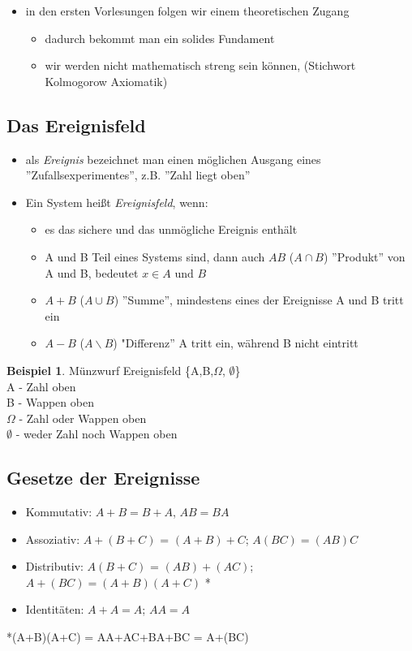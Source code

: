 \documentclass[10pt]{report}
\theoremstyle{definition}
\newtheorem{exmp}{Beispiel}
\begin{document}
\begin{itemize}
	\item in den ersten Vorlesungen folgen wir einem theoretischen Zugang
	\begin{itemize}
		\item dadurch bekommt man ein solides Fundament
		\item wir werden nicht mathematisch streng sein können, (Stichwort Kolmogorow Axiomatik)
	\end{itemize}
\end{itemize}
\subsection{Das Ereignisfeld}
\begin{itemize}
	\item als \textit{Ereignis} bezeichnet man einen möglichen Ausgang eines ''Zufallsexperimentes'', z.B. ''Zahl liegt oben''
	\item Ein System heißt \textit{Ereignisfeld}, wenn:
	\begin{itemize}
		\item es das sichere und das unmögliche Ereignis enthält

				\item A und B Teil eines Systems sind, dann auch $AB$ ($A\cap B$) ''Produkt'' von A und B, bedeutet $x \in A \text{ und } B$
			\item $A+B$ ($A \cup B$) ''Summe'', mindestens eines der Ereignisse A und B tritt ein
			\item $A-B$ ($A\backslash B$) "Differenz'' A tritt ein, während B nicht eintritt

	
	\end{itemize}
\end{itemize}
\begin{exmp}
	Münzwurf Ereignisfeld \{A,B,$\Omega$, $\emptyset$\}\\
	A - Zahl oben\\B - Wappen oben \\ $\Omega$ - Zahl oder Wappen oben \\ $\emptyset$ - weder Zahl noch Wappen oben
\end{exmp}

\subsection{Gesetze der Ereignisse}
\begin{itemize}
	\item Kommutativ: $A+B = B+A$, $AB = BA$
	\item Assoziativ: $A+(B+C)$ = $(A+B)+C$; $A(BC) = (AB)C$
	\item Distributiv: $A(B+C)$ = $(AB)+(AC)$; $A+(BC) = (A+B)(A+C)$ *
	\item Identitäten: $A+A = A$; $AA = A$
\end{itemize}
*(A+B)(A+C) = AA+AC+BA+BC = A+(BC)
\end{document}
